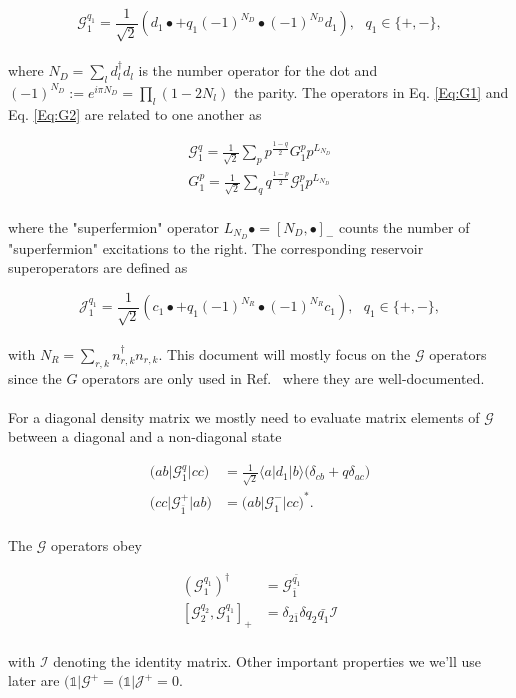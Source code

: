 \documentclass{article}
\newcommand{\bra}[1]{\ensuremath{\langle #1 |}}
\newcommand{\ket}[1]{\ensuremath{|#1\rangle}}
\newcommand{\bral}[1]{\ensuremath{( #1 |}}
\newcommand{\ketl}[1]{\ensuremath{|#1)}}
\newcommand{\G}{\ensuremath{\mathcal{G}}}
\begin{document}
\begin{equation}
	\mathcal{G}_1^{q_1}=\frac{1}{\sqrt{2}}\left(d_1\bullet  + q_1(-1)^{N_D}\bullet (-1)^{N_D}d_1\right),\ \ \ q_1\in \{+,-\},
	\label{Eq:G2}
\end{equation}
\\
where $N_D=\sum_l d^\dagger_l d_l$ is the number operator for the dot and $(-1)^{N_D}:=e^{i\pi N_D}=\prod_l (1-2N_l)$ the parity. The operators in Eq. \ref{Eq:G1} and Eq. \ref{Eq:G2} are related to one another as 

\begin{align}
	\mathcal{G}^q_1 = \frac{1}{\sqrt{2}}\sum_p p^{\frac{1-q}{2}}G_1^p p^{L_{N_D}} \\
	G^p_1 = \frac{1}{\sqrt{2}}\sum_q q^{\frac{1-p}{2}}\mathcal{G}_1^p p^{L_{N_D}}
\end{align}
\\
where the "superfermion" operator $L_{N_D}\bullet=[N_D, \bullet]_-$ counts the number of "superfermion" excitations to the right.  The corresponding reservoir superoperators are defined as 

\begin{equation}
	\mathcal{J}_1^{q_1}=\frac{1}{\sqrt{2}}\left(c_1\bullet  + q_1(-1)^{N_R}\bullet (-1)^{N_R}c_1\right),\ \ \ q_1\in \{+,-\},
	\label{Eq:J2}
\end{equation}
\\
with $N_R = \sum_{r, k}n^\dagger_{r,k}n_{r,k}$. This document will mostly focus on the $\mathcal{G}$ operators since the $G$ operators are only used in Ref.~\cite{leijnse2008kinetic} where they are well-documented.
\\
\\
For a diagonal density matrix we mostly need to evaluate matrix elements of $\mathcal{G}$ between a diagonal and a non-diagonal state

\begin{align}
	\bral{ab}\mathcal{G}^q_1\ketl{cc} &= \frac{1}{\sqrt{2}} \bra{a}d_1\ket{b}\big ( \delta_{cb} + q\delta_{ac}\big ) \\
	\bral{cc}\mathcal{G}^+_{\bar{1}}\ketl{ab} &= \bral{ab}\mathcal{G}^-_1\ketl{cc}^*.
    \label{Eq:MeG2}
\end{align}
\\
The $\mathcal{G}$ operators obey 

\begin{align}
	(\mathcal{G}_1^{q_1})^\dagger &= \mathcal{G}_{\bar{1}}^{\bar{q_1}} \\
	[\G_2^{q_2}, \G_1^{q_1}]_+ &= \delta_{2\bar{1}}\delta{q_2\bar{q_1}}\mathcal{I}
\end{align}
\\
with $\mathcal{I}$ denoting the identity matrix. Other important properties we we'll use later are $\bral{\mathbb{1}}\mathcal{G}^+=\bral{\mathbb{1}}\mathcal{J}^+=0$. 
\end{document}
